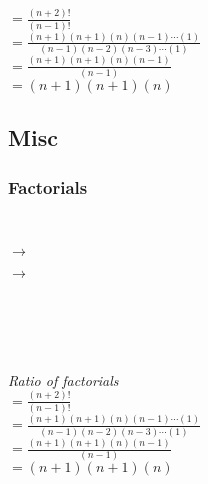 \documentclass{article}
\begin{document}
        $=\frac{(n+2)!}{(n-1)!}$\\[15pt]
        
        $= \frac{(n+1)(n+1)(n)(n-1)\cdots(1)}{(n-1)(n-2)(n-3)\cdots(1)}$\\[15pt]
        
        $= \frac{(n+1)(n+1)(n)(n-1)}{(n-1)}$\\[15pt]

        $= {(n+1)(n+1)(n)}$\\[15pt]

        \endgroup
    \pagebreak



\subsection{\centering \huge Misc}
    \centering
    \subsubsection{\huge Factorials}

        \hrulefill \\[10pt]


            $\rightarrow$


            $\rightarrow$


            \hrulefill \\[10pt]

    \\

    \hrulefill \\[10pt]

    \\[5pt]
    \textit{Ratio of factorials}\\[15pt]

    $=\frac{(n+2)!}{(n-1)!}$\\[15pt]
    
    $= \frac{(n+1)(n+1)(n)(n-1)\cdots(1)}{(n-1)(n-2)(n-3)\cdots(1)}$\\[15pt]
    
    $= \frac{(n+1)(n+1)(n)(n-1)}{(n-1)}$\\[15pt]

    $= {(n+1)(n+1)(n)}$\\[15pt]
\end{document}
